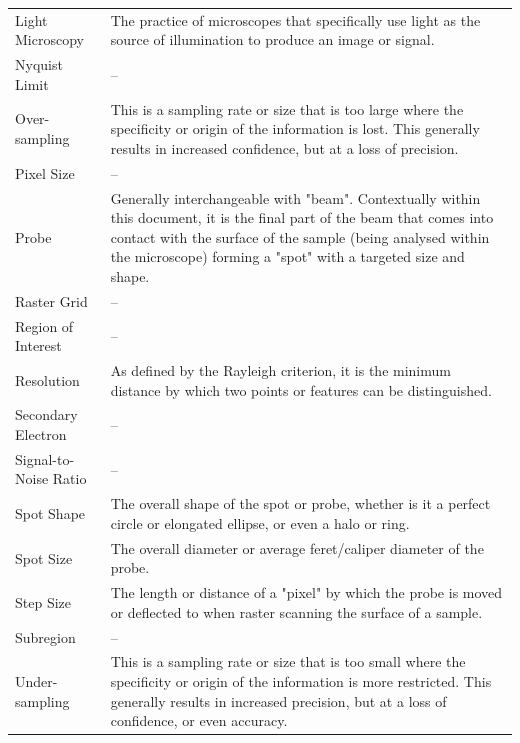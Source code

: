 \documentclass[12pt]{article}
\begin{document}
\begin{center}
\begin{longtable}{p{4.25cm} p{11.25cm}}
        Light Microscopy & The practice of microscopes that specifically use light as the source of illumination to produce an image or signal. \\
        
        Nyquist Limit & -- \\
        
        Over-sampling & This is a sampling rate or size that is too large where the specificity or origin of the information is lost. This generally results in increased confidence, but at a loss of precision.\\
        
        Pixel Size & -- \\
        
        Probe & Generally interchangeable with "beam". Contextually within this document, it is the final part of the beam that comes into contact with the surface of the sample (being analysed within the microscope) forming a "spot" with a targeted size and shape. \\
        
        Raster Grid & -- \\
        
        Region of Interest & -- \\
        
        Resolution & As defined by the Rayleigh criterion, it is the minimum distance by which two points or features can be distinguished. \\
        
        Secondary Electron & -- \\
        
        Signal-to-Noise Ratio & -- \\
        
        Spot Shape & The overall shape of the spot or probe, whether is it a perfect circle or elongated ellipse, or even a halo or ring. \\
        
        Spot Size & The overall diameter or average feret/caliper diameter of the probe. \\
        
        Step Size & The length or distance of a "pixel" by which the probe is moved or deflected to when raster scanning the surface of a sample. \\
        
        Subregion & -- \\

        Under-sampling & This is a sampling rate or size that is too small where the specificity or origin of the information is more restricted. This generally results in increased precision, but at a loss of confidence, or even accuracy. \\
        \bottomrule
    \end{longtable} 
\end{center}
\end{document}
